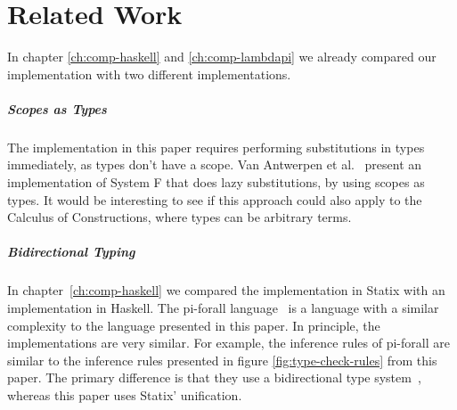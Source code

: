 \chapter{Related Work}
\label{ch:relatedwork}

In chapter \ref{ch:comp-haskell} and \ref{ch:comp-lambdapi} we already compared our implementation with two different implementations. 

\paragraph{Scopes as Types}

The implementation in this paper requires performing substitutions in types immediately, as types don't have a scope. Van Antwerpen et al.~\cite[sect 2.5]{scopes_as_types} present an implementation of System F that does lazy substitutions, by using scopes as types. It would be interesting to see if this approach could also apply to the Calculus of Constructions, where types can be arbitrary terms. 

\paragraph{Bidirectional Typing}

In chapter~\ref{ch:comp-haskell} we compared the implementation in Statix with an implementation in Haskell. The pi-forall language~\cite{pi_forall} is a language with a similar complexity to the language presented in this paper. In principle, the implementations are very similar. For example, the inference rules of pi-forall are similar to the inference rules presented in figure \ref{fig:type-check-rules} from this paper. The primary difference is that they use a bidirectional type system~\cite{bidirectional}, whereas this paper uses Statix' unification.

\paragraph{}